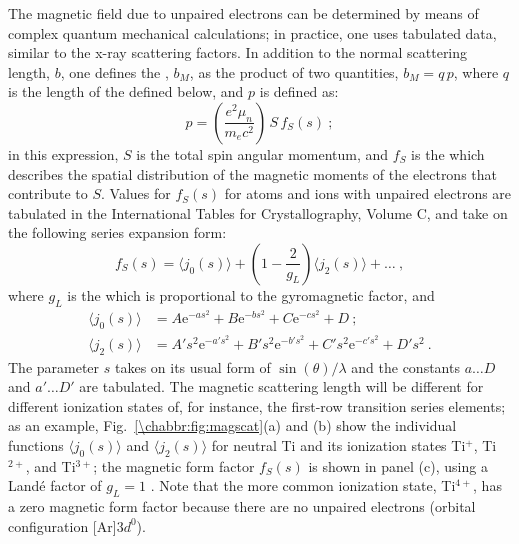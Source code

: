 The magnetic field due to unpaired electrons can be determined by means of complex quantum mechanical calculations; in practice, one uses tabulated data, similar to the x-ray scattering factors. In addition to the normal scattering length, $b$, one defines the , $b_M$, as the product of two quantities, $b_M=q\,p$, where $q$ is the length of the  defined below, and $p$ is defined as:
\begin{equation}
	p=\left(\frac{e^2\mu_n}{m_e c^2}\right)\,S\,f_S(s)\ ;
\end{equation}
in this expression, $S$ is the total spin angular momentum, and $f_S$ is the  which describes the spatial distribution of the magnetic moments of the electrons that contribute to $S$.  Values for $f_S(s)$ for atoms and ions with unpaired electrons are tabulated in the International Tables for Crystallography, Volume C, and take on the following series expansion form:
\begin{equation}
	f_S(s)=\langle j_0(s)\rangle+(1-\frac{2}{g_L})\langle j_2(s)\rangle + \ldots\ ,
\end{equation}
where $g_L$ is the  which is proportional to the gyromagnetic factor, and 
\begin{equation*}
\begin{split}
	\langle j_0(s)\rangle&=A\mathrm{e}^{-as^2}+B\mathrm{e}^{-bs^2}+C\mathrm{e}^{-cs^2}+D\ ;\\
	\langle j_2(s)\rangle&=A's^2\mathrm{e}^{-a's^2}+B's^2\mathrm{e}^{-b's^2}+C's^2\mathrm{e}^{-c's^2}+D's^2\ .
\end{split}
\end{equation*}
The parameter $s$ takes on its usual form of $\sin(\theta)/\lambda$ and the constants $a\ldots D$ and $a'\ldots D'$ are tabulated. The magnetic scattering length will be different for different ionization states of, for instance, the first-row transition series elements; as an example, Fig.~\ref{\chabbr:fig:magscat}(a) and (b) show the individual functions $\langle j_0(s)\rangle$ and $\langle j_2(s)\rangle$ for neutral Ti and its ionization states Ti$^+$, Ti$^{2+}$, and Ti$^{3+}$; the magnetic form factor $f_S(s)$ is shown in panel (c), using a Land\'e factor of $g_L=1$ .  Note that the more common ionization state, Ti$^{4+}$, has a zero magnetic form factor because there are no unpaired electrons (orbital configuration [Ar]$3d^0$).

